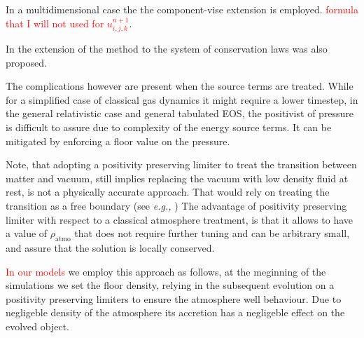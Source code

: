 \documentclass[11pt,a4paper,headinclude=true,DIV=14,BCOR=8mm,chapterprefix,listof=totoc,twoside,openright,abstracton]{scrbook}
\begin{document}
\begin{itemize}
\begin{itemize}
        In a multidimensional case the the component-vise extension is employed. \textcolor{red}{formula that I will not used for $u_{i,j,k}^{n+1}$}.
        
        In \cite{Hu:2013} the extension of the method to the system of conservation laws was also proposed. 
        
        The complications however are present when the source terms are treated. While for a simplified case of classical gas dynamics it might require a lower timestep, in the general relativistic case and general tabulated EOS, the positivist of pressure is difficult to assure due to complexity of the energy source terms. It can be mitigated by enforcing a floor value on the pressure.
        
        Note, that adopting a positivity preserving limiter to treat the transition between matter and vacuum, still implies replacing the vacuum with low density fluid at rest, is not a physically accurate approach. That would rely on treating the transition as a free boundary (see \textit{e.g.,} \cite{Kastaun:2006}) The advantage of positivity preserving limiter with respect to a classical atmosphere treatment, is that it allows to have a value of $\rho_{\text{atmo}}$ that does not require further tuning and can be arbitrary small, and assure that the solution is locally conserved. 
            
        \textcolor{red}{In our models} we employ this approach as follows, at the meginning of the simulations we set the floor density, relying in the subsequent evolution on a positivity preserving limiters to ensure the atmosphere well behaviour. Due to negligeble density of the atmosphere its accretion has a negligeble effect on the evolved object. 
        
        
    \end{itemize}


\end{itemize}
\end{document}

